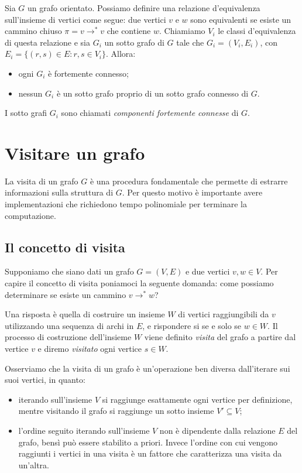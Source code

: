 Sia $G$ un grafo orientato. Possiamo definire una relazione
d'equivalenza sull'insieme di vertici come segue: due vertici $v$ e
$w$ sono equivalenti se esiste un cammino chiuso $\pi = v
\rightarrow^{*} v$ che contiene $w$. Chiamiamo $V_{i}$ le classi
d'equivalenza di questa relazione e sia $G_{i}$ un sotto grafo di $G$
tale che $G_{i} = (V_{i}, E_{i})$, con $E_{i} = \{(r,s) \in E: r,s \in
V_{i} \}$. Allora:
\begin{itemize}
\item ogni $G_{i}$ \`e fortemente connesso;
\item nessun $G_{i}$ \`e un sotto grafo proprio di un sotto grafo
  connesso di $G$.
\end{itemize}
I sotto grafi $G_{i}$ sono chiamati \emph{componenti fortemente
  connesse} di $G$.


\section{Visitare un grafo}

La visita di un grafo $G$ \`e una procedura fondamentale che permette
di estrarre informazioni sulla struttura di $G$. Per questo motivo \`e
importante avere implementazioni che richiedono tempo polinomiale per
terminare la computazione.

\subsection{Il concetto di visita}
Supponiamo che siano dati un grafo $G = (V, E)$ e due vertici $v,w \in
V$. Per capire il concetto di visita poniamoci la seguente domanda:
come possiamo determinare se esiste un cammino $v \rightarrow^{*} w$?

Una risposta \`e quella di costruire un insieme $W$ di vertici
raggiungibili da $v$ utilizzando una sequenza di archi in $E$, e
rispondere si se e solo se $w \in W$.  Il processo di costruzione
dell'insieme $W$ viene definito \emph{visita} del grafo a partire dal
vertice $v$ e diremo \emph{visitato} ogni vertice $s \in W$.

Osserviamo che la visita di un grafo \`e un'operazione ben diversa
dall'iterare sui suoi vertici, in quanto:
\begin{itemize}
\item iterando sull'insieme $V$ si raggiunge esattamente ogni vertice
  per definizione, mentre visitando il grafo si raggiunge un sotto
  insieme $V' \subseteq V$;
\item l'ordine seguito iterando sull'insieme $V$ non \`e dipendente
  dalla relazione $E$ del grafo, bens\`i pu\`o essere stabilito a
  priori. Invece l'ordine con cui vengono raggiunti i vertici in una
  visita \`e un fattore che caratterizza una visita da un'altra.
\end{itemize}


